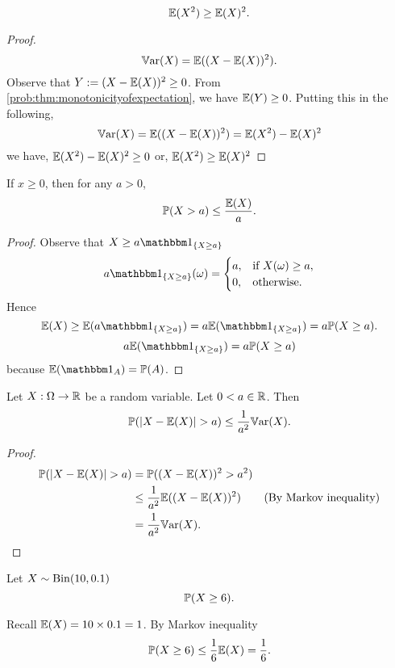 \documentclass[10pt, a4paper]{article}
\begin{document}
\begin{corollary}
    \[
    \E(X ^ 2) \geq \E(X) ^ 2.
    \]
    \begin{proof}
        \[
        \Var(X) = \E((X - \E(X)) ^ 2).
        \]
        Observe that $Y := (X - \E(X)) ^ 2 \geq 0$.
        From \autoref{prob:thm:monotonicityofexpectation},
        we have $\E(Y) \geq 0$.
        Putting this in the following,
        \[
        \Var(X) = \E((X - \E(X)) ^ 2) = \E(X ^ 2) - \E(X) ^ 2
        \]
        we have,
        $\E(X ^ 2) - \E(X) ^ 2 \geq 0$ or,
        $\E(X ^ 2) \geq \E(X) ^ 2$
    \end{proof}
\end{corollary}

\begin{corollary}
    If $x \geq 0$,
    then for any $a > 0$,
    \[
    \P(X > a) \leq \frac{\E(X)}{a}.
    \]
    \begin{proof}
        Observe that $X \geq a\ind[\{X \geq a\}]$
        \[
        a\ind[\{X \geq a\}](\omega) = \begin{cases}
            a, & \text{if } X(\omega) \geq a, \\
            0, & \text{otherwise}.
        \end{cases}
        \]
        Hence
        \[
        \E(X) \geq \E(a\ind[\{X \geq a\}]) = a\E(\ind[\{X \geq a\}]) = a\P(X \geq a).
        \]
        \[
        a\E(\ind[\{X \geq a\}]) = a\P(X \geq a)
        \]
        because $\E(\ind) = \P(A)$.
    \end{proof}
\end{corollary}

\begin{corollary}\label{prob:col:chebyshevineq}
    Let $X : \Omega \rightarrow \R$ be a random variable.
    Let $0 < a \in \R$.
    Then
    \[
    \P(|X - \E(X)| > a) \leq \frac{1}{a ^ 2}\Var(X).
    \]
    \begin{proof}
        \begin{align*}
            \P(|X - \E(X)| > a) &= \P((X - \E(X)) ^ 2 > a ^ 2) \\
            &\leq \frac{1}{a ^ 2}\E((X - \E(X)) ^ 2) & \text{(By Markov inequality)} \\
            &= \frac{1}{a ^ 2}\Var(X).
        \end{align*}
    \end{proof}
\end{corollary}

\begin{example}
    Let $X \sim \Bin(10, 0.1)$
    \[
    \P(X \geq 6).
    \]

    Recall $\E(X) = 10 \times 0.1 = 1$.
    By Markov inequality
    \[
    \P(X \geq 6) \leq \frac{1}{6}\E(X) = \frac{1}{6}.
    \]
\end{example}
\end{document}
